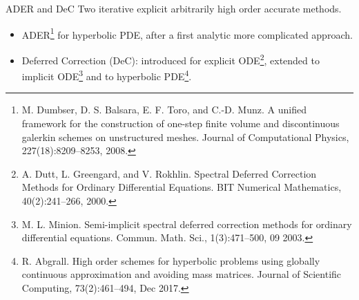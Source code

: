 \documentclass[9pt,compress,t,aspectratio=169]{beamer}
\begin{document}
\begin{frame}{ADER and DeC}
Two iterative explicit arbitrarily high order accurate methods.
\begin{itemize}
\item ADER\footnote{M. Dumbser, D. S. Balsara, E. F. Toro, and C.-D. Munz. A unified framework for the construction of one-step finite volume and discontinuous galerkin schemes on unstructured meshes. Journal of Computational Physics, 227(18):8209–8253, 2008.} for hyperbolic PDE, after a first analytic more complicated approach.
\item Deferred Correction (DeC): introduced for explicit ODE\footnote{A. Dutt, L. Greengard, and V. Rokhlin. Spectral Deferred Correction Methods for Ordinary Differential Equations. BIT Numerical Mathematics, 40(2):241–266, 2000.}, extended to implicit ODE\footnote{M. L. Minion. Semi-implicit spectral deferred correction methods for ordinary differential equations. Commun. Math. Sci., 1(3):471–500, 09 2003.} and to hyperbolic PDE\footnote{R. Abgrall. High order schemes for hyperbolic problems using globally continuous approximation and avoiding mass matrices. Journal of Scientific Computing, 73(2):461–494, Dec 2017.}.
\end{itemize}
\end{frame}
\end{document}
